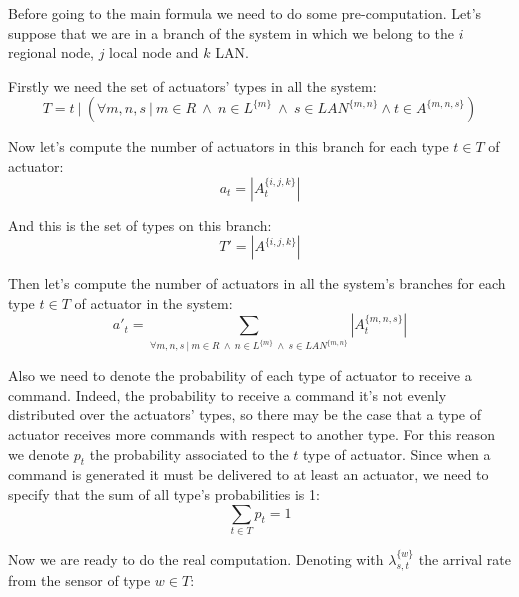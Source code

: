 \documentclass[11pt]{article}
\begin{document}
Before going to the main formula we need to do some pre-computation.
Let's suppose that we are in a branch of the system in which we belong to the $i$ regional node, $j$ local node and $k$ LAN.

Firstly we need the set of actuators' types in all the system:
\begin{equation}
    T = t \ | \ (\forall m,n,s \ | \ m \in R \ \land \ n \in L^{\{m\}} \ \land \ s \in LAN^{\{m, n\}} \land t \in A^{\{m,n,s\}})
\end{equation}

Now let's compute the number of actuators in this branch for each type $t \in T$ of actuator:
\begin{equation}
    a_{t} = | A^{\{i, j, k\}}_{t} | 
\end{equation}

And this is the set of types on this branch:
\begin{equation}
    T' = | A^{\{i, j, k\}} | 
\end{equation}



Then let's compute the number of actuators in all the system's branches for each type $t \in T$ of actuator in the system:
\begin{equation}
    a'_{t} = \sum_{\forall m,n,s \ | \ m \in R \ \land \ n \in L^{\{m\}} \ \land \ s \in LAN^{\{m, n\}}}{ |A^{\{m, n, s\}}_{t}| }
\end{equation}


Also we need to denote the probability of each type of actuator to receive a command. Indeed, the probability to receive a command it's not evenly distributed over the actuators' types, so there may be the case that a type of actuator receives more commands with respect to another type.
For this reason we denote $p_t$ the probability associated to the $t$ type of actuator.
Since when a command is generated it must be delivered to at least an actuator, we need to specify that the sum of all type's probabilities is 1:
\begin{equation}
    \sum_{t \in T}{p_t} = 1
\end{equation}

Now we are ready to do the real computation. Denoting with $\lambda^{\{w\}}_{s, t}$ the arrival rate from the sensor of type $w \in T$: 
\end{document}
